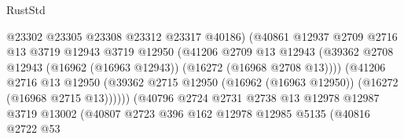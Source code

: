 \begin{lexlean}{RustStd}
\begin{coremodule}
                                          @23302
                                          @23305
                                          @23308
                                          @23312
                                          @23317
                                          @40186)
                                        (@40861
                                          @12937
                                          @2709
                                          @2716
                                          @13
                                          @3719
                                          @12943
                                          @3719
                                          @12950
                                          (@41206
                                            @2709
                                            @13
                                            @12943
                                            (@39362
                                              @2708
                                              @12943
                                              (@16962 (@16963 @12943))
                                              (@16272 (@16968 @2708 @13))))
                                          (@41206
                                            @2716
                                            @13
                                            @12950
                                            (@39362
                                              @2715
                                              @12950
                                              (@16962 (@16963 @12950))
                                              (@16272 (@16968 @2715 @13))))))
                                      (@40796
                                        @2724
                                        @2731
                                        @2738
                                        @13
                                        @12978
                                        @12987
                                        @3719
                                        @13002
                                        (@40807
                                          @2723
                                          @396
                                          @162
                                          @12978
                                          @12985
                                          @5135
                                          (@40816
                                            @2722
                                            @53

\end{coremodule}
\end{lexlean}
